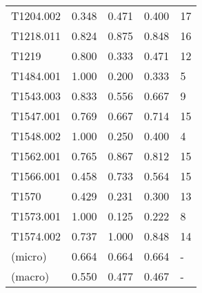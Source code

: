 \begin{tabular}{lrrrl}
    T1204.002 & 0.348 & 0.471 & 0.400 & 17  \\
    T1218.011 & 0.824 & 0.875 & 0.848 & 16  \\
    T1219     & 0.800 & 0.333 & 0.471 & 12  \\
    T1484.001 & 1.000 & 0.200 & 0.333 & 5   \\
    T1543.003 & 0.833 & 0.556 & 0.667 & 9   \\
    T1547.001 & 0.769 & 0.667 & 0.714 & 15  \\
    T1548.002 & 1.000 & 0.250 & 0.400 & 4   \\
    T1562.001 & 0.765 & 0.867 & 0.812 & 15  \\
    T1566.001 & 0.458 & 0.733 & 0.564 & 15  \\
    T1570     & 0.429 & 0.231 & 0.300 & 13  \\
    T1573.001 & 1.000 & 0.125 & 0.222 & 8   \\
    T1574.002 & 0.737 & 1.000 & 0.848 & 14 \\
    (micro)   & 0.664 & 0.664 & 0.664 & - \\
    (macro)   & 0.550 & 0.477 & 0.467 & -   \\
    \bottomrule
\end{tabular}
